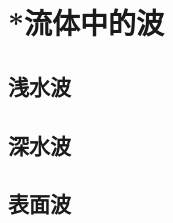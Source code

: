 

\section{*流体中的波}\label{9-4}

\subsection{浅水波}\label{9-4-1}

\subsection{深水波}\label{9-4-2}

\subsection{表面波}\label{9-4-3}